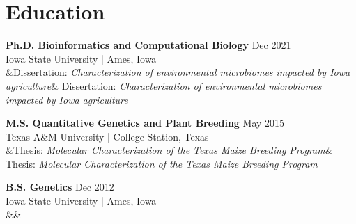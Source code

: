 \newcommand{\Edu}[4]{
  \textbf{#1} \hfill #3 \\   %
  #2 \\                      %
  \ifx&#4&\else              %
    #4 \\
  \fi
}


\section*{Education}

\Edu
  {Ph.D. Bioinformatics and Computational Biology}
  {Iowa State University | Ames, Iowa}
  {Dec 2021}
  {Dissertation: \textit{Characterization of environmental microbiomes impacted by Iowa agriculture}}
  \vspace{0.5em}             %

\Edu
  {M.S. Quantitative Genetics and Plant Breeding}
  {Texas A\&M University | College Station, Texas}
  {May 2015}
  {Thesis: \textit{Molecular Characterization of the Texas Maize Breeding Program}}
  \vspace{0.5em}             %

\Edu
  {B.S. Genetics}
  {Iowa State University | Ames, Iowa}
  {Dec 2012}
  {}
